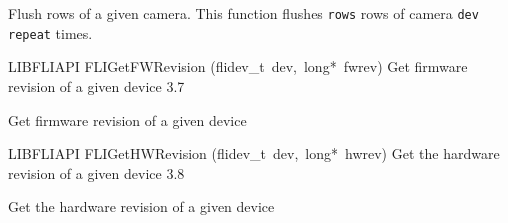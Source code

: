 \documentclass{article}
\begin{document}
\begin{cxxentry}
\begin{cxxfunction}
\begin{cxxdoc}
Flush rows of a given camera.  This function flushes \texttt{rows}
rows of camera \texttt{dev} \texttt{repeat} times.


\end{cxxdoc}
\end{cxxfunction}
\begin{cxxfunction}
{LIBFLIAPI}
        {FLIGetFWRevision}
        {(flidev\_t\ dev,\ long*\ fwrev)}
        { Get firmware revision of a given device  }
        {3.7}
\begin{cxxdoc}

Get firmware revision of a given device


\end{cxxdoc}
\end{cxxfunction}
\begin{cxxfunction}
{LIBFLIAPI}
        {FLIGetHWRevision}
        {(flidev\_t\ dev,\ long*\ hwrev)}
        { Get the hardware revision of a given device  }
        {3.8}
\begin{cxxdoc}

Get the hardware revision of a given device



\end{cxxdoc}
\end{cxxfunction}
\end{cxxentry}
\end{document}
